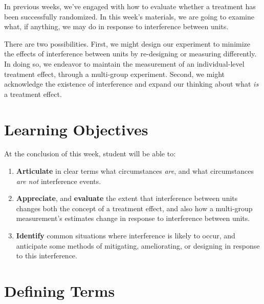 \documentclass[
]{book}
\providecommand{\tightlist}{%
  \setlength{\itemsep}{0pt}\setlength{\parskip}{0pt}}
\begin{document}
In previous weeks, we've engaged with how to evaluate whether a
treatment has been successfully randomized. In this week's materials, we
are going to examine what, if anything, we may do in response to
interference between units.

There are two possibilities. First, we might design our experiment to
minimize the effects of interference between units by re-designing or
measuring differently. In doing so, we endeavor to maintain the
measurement of an individual-level treatment effect, through a
multi-group experiment. Second, we might acknowledge the existence of
interference and expand our thinking about what \emph{is} a treatment
effect.

\hypertarget{learning-objectives-8}{%
\section{Learning Objectives}\label{learning-objectives-8}}

At the conclusion of this week, student will be able to:

\begin{enumerate}
\def\labelenumi{\arabic{enumi}.}
\tightlist
\item
  \textbf{Articulate} in clear terms what circumstances \emph{are}, and
  what circumstances \emph{are not} interference events.
\item
  \textbf{Appreciate}, and \textbf{evaluate} the extent that
  interference between units changes both the concept of a treatment
  effect, and also how a multi-group measurement's estimates change in
  response to interference between units.
\item
  \textbf{Identify} common situations where interference is likely to
  occur, and anticipate some methods of mitigating, ameliorating, or
  designing in response to this interference.
\end{enumerate}

\hypertarget{defining-terms}{%
\section{Defining Terms}\label{defining-terms}}
\end{document}
